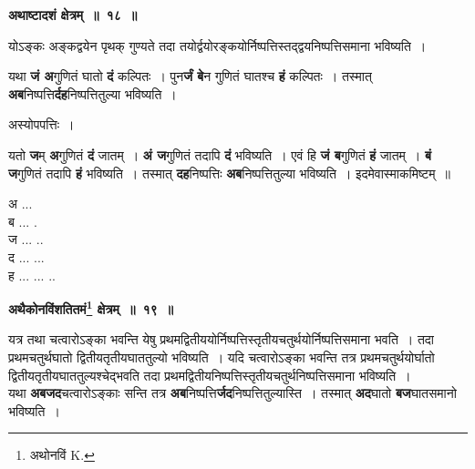 \documentclass[11pt, openany]{book}
\begin{document}
\begin{center}
\textbf{\large अथाष्टादशं क्षेत्रम्~॥~१८~॥}
\end{center}

{\ab योऽङ्कः अङ्कद्वयेन पृथक् गुण्यते तदा तयोर्द्वयोरङ्कयोर्निष्पत्तिस्तद्द्वयनिष्पत्तिसमाना भविष्यति~। }

\newpage
 यथा \textbf{जं अ}गुणितं घातो \textbf{दं} कल्पितः~। पुन\textbf{र्जं बे}न गुणितं घातश्च \textbf{हं} कल्पितः~। तस्मात् \textbf{अब}निष्पत्ति\textbf{र्दह}निष्पत्तितुल्या भविष्यति~।

\begin{center}
अस्योपपत्तिः~।
\end{center}

\begin{flushleft}
\begin{minipage}[t]{0.7\textwidth}
\hspace{4mm} यतो \textbf{ज}म् \textbf{अ}गुणितं \textbf{दं} जातम्~। \textbf{अं ज}गुणितं तदापि \textbf{दं} भविष्यति~। एवं हि \textbf{जं ब}गुणितं \textbf{हं} जातम्~। \textbf{बं ज}गुणितं तदापि \textbf{हं} भविष्यति~। तस्मात् \textbf{दह}निष्पत्तिः \textbf{अब}निष्पत्तितुल्या भविष्यति~। इदमेवास्माकमिष्टम्~॥
\end{minipage} 
\hfill
\begin{minipage}[t]{0.2\textwidth}
\vspace{-8mm}
अ ...\\
ब ... .\\
ज ... .. \\
द ... ...\\
ह ... ... ..
\end{minipage}
\end{flushleft}
\vspace{-1mm}

\begin{center}
\textbf{\large अथैकोनविंशतितमं\renewcommand{\thefootnote}{१}\footnote{अथोनविं {\en K.}} क्षेत्रम्~॥~१९~॥}
\end{center}

 {\ab यत्र तथा चत्वारोऽङ्का भवन्ति येषु प्रथमद्वितीययोर्निष्पत्तिस्तृतीयचतुर्थयोर्निष्पत्तिसमाना भवति~। तदा प्रथमचतुर्थघातो द्वितीयतृतीयघाततुल्यो भविष्यति~। यदि चत्वारोऽङ्का भवन्ति तत्र प्रथमचतुर्थयोर्घातो द्वितीयतृतीयघाततुल्यश्चेद्भवति तदा प्रथमद्वितीयनिष्पत्तिस्तृतीयचतुर्थनिष्पत्तिसमाना भविष्यति~।}\\ 

 यथा \textbf{अबजद}चत्वारोऽङ्काः सन्ति तत्र \textbf{अब}निष्पत्ति\textbf{र्जद}निष्पत्तितुल्यास्ति~। तस्मात् \textbf{अद}घातो \textbf{बज}घातसमानो भविष्यति~। 
 
\end{document}

